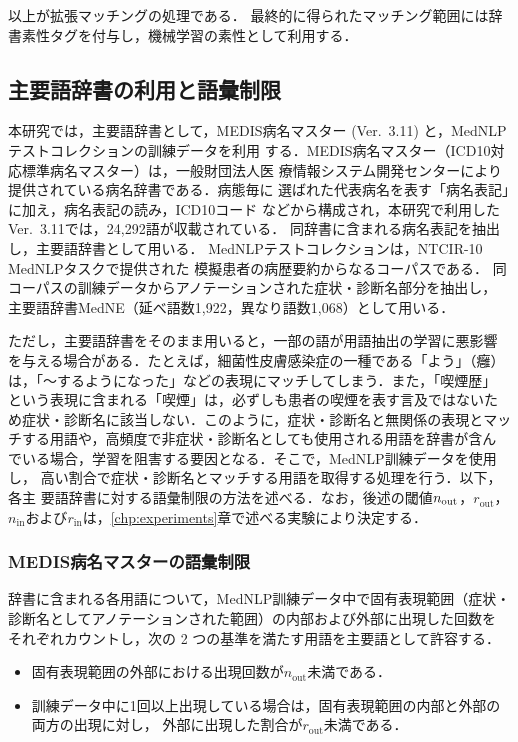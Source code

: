 \documentclass[japanese]{jnlp_1.4}
\begin{document}
以上が拡張マッチングの処理である．
最終的に得られたマッチング範囲には辞書素性タグを付与し，機械学習の素性として利用する．


\subsection{主要語辞書の利用と語彙制限}
\label{sec:maindic_filtering}

本研究では，主要語辞書として，MEDIS病名マスター (Ver.~3.11)
と，MedNLPテストコレクション\cite{morita2013overview}の訓練データを利用
する．MEDIS病名マスター（ICD10対応標準病名マスター）は，一般財団法人医
療情報システム開発センターにより提供されている病名辞書である．病態毎に
選ばれた代表病名を表す「病名表記」に加え，病名表記の読み，ICD10コード
などから構成され，本研究で利用したVer.~3.11では，24,292語が収載されている．
同辞書に含まれる病名表記を抽出し，主要語辞書として用いる．
MedNLPテストコレクションは，NTCIR-10 MedNLPタスクで提供された
模擬患者の病歴要約からなるコーパスである．
同コーパスの訓練データからアノテーションされた症状・診断名部分を抽出し，
主要語辞書MedNE（延べ語数1,922，異なり語数1,068）として用いる．

ただし，主要語辞書をそのまま用いると，一部の語が用語抽出の学習に悪影響
を与える場合がある．たとえば，細菌性皮膚感染症の一種である「よう」（癰）
は，「〜するようになった」などの表現にマッチしてしまう．また，「喫煙歴」
という表現に含まれる「喫煙」は，必ずしも患者の喫煙を表す言及ではないた
め症状・診断名に該当しない．このように，症状・診断名と無関係の表現とマッ
チする用語や，高頻度で非症状・診断名としても使用される用語を辞書が含ん
でいる場合，学習を阻害する要因となる．そこで，MedNLP訓練データを使用し，
高い割合で症状・診断名とマッチする用語を取得する処理を行う．以下，各主
要語辞書に対する語彙制限の方法を述べる．なお，後述の閾値$n_{\rm
  out}$，$r_\mathrm{out}$，$n_\mathrm{in}$および$r_\mathrm{in}$は，\ref{chp:experiments}章で述べる実験により決定する．


\subsubsection*{MEDIS病名マスターの語彙制限}

辞書に含まれる各用語について，MedNLP訓練データ中で固有表現範囲（症状・
診断名としてアノテーションされた範囲）の内部および外部に出現した回数を
それぞれカウントし，次の 2 つの基準を満たす用語を主要語として許容する．
\begin{itemize}
\item 固有表現範囲の外部における出現回数が$n_\mathrm{out}$未満である．
\item 訓練データ中に1回以上出現している場合は，固有表現範囲の内部と外部の両方の出現に対し，
外部に出現した割合が$r_\mathrm{out}$未満である．
\end{itemize}
\end{document}
